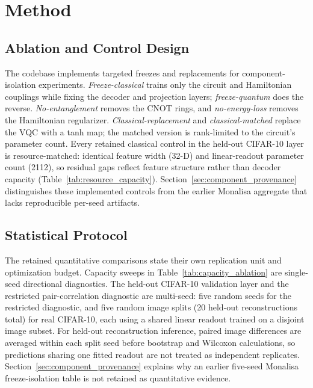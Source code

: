 \documentclass[11pt]{article}
\begin{document}
\section{Method}

\subsection{Ablation and Control Design}
The codebase implements targeted freezes and replacements for component-isolation experiments. \emph{Freeze-classical} trains only the circuit and Hamiltonian couplings while fixing the decoder and projection layers; \emph{freeze-quantum} does the reverse. \emph{No-entanglement} removes the CNOT rings, and \emph{no-energy-loss} removes the Hamiltonian regularizer. \emph{Classical-replacement} and \emph{classical-matched} replace the VQC with a tanh map; the matched version is rank-limited to the circuit's parameter count. Every retained classical control in the held-out CIFAR-10 layer is resource-matched: identical feature width (32-D) and linear-readout parameter count (2112), so residual gaps reflect feature structure rather than decoder capacity (Table~\ref{tab:resource_capacity}). Section~\ref{sec:component_provenance} distinguishes these implemented controls from the earlier Monalisa aggregate that lacks reproducible per-seed artifacts.

\subsection{Statistical Protocol}
The retained quantitative comparisons state their own replication unit and optimization budget. Capacity sweeps in Table~\ref{tab:capacity_ablation} are single-seed directional diagnostics. The held-out CIFAR-10 validation layer and the restricted pair-correlation diagnostic are multi-seed: five random seeds for the restricted diagnostic, and five random image splits (20 held-out reconstructions total) for real CIFAR-10, each using a shared linear readout trained on a disjoint image subset. For held-out reconstruction inference, paired image differences are averaged within each split seed before bootstrap and Wilcoxon calculations, so predictions sharing one fitted readout are not treated as independent replicates. Section~\ref{sec:component_provenance} explains why an earlier five-seed Monalisa freeze-isolation table is not retained as quantitative evidence.
\end{document}
